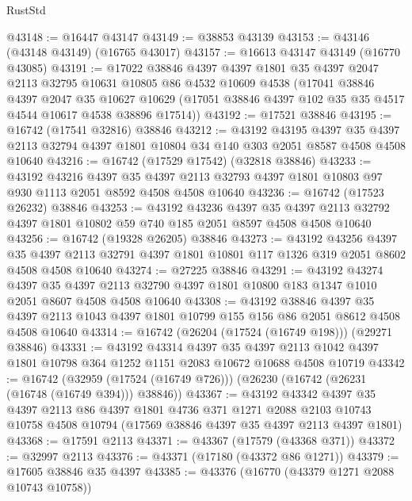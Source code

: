 \begin{lexlean}{RustStd}
\begin{coremodule}
@43148 := @16447 @43147
@43149 := @38853 @43139
@43153 := @43146 (@43148 @43149) (@16765 @43017)
@43157 := @16613 @43147 @43149 (@16770 @43085)
@43191 := @17022
    @38846
    @4397
    @4397
    @1801
    @35
    @4397
    @2047
    @2113
    @32795
    @10631
    @10805
    @86
    @4532
    @10609
    @4538
    (@17041
      @38846
      @4397
      @2047
      @35
      @10627
      @10629
      (@17051 @38846 @4397 @102 @35 @35 @4517 @4544 @10617 @4538 @38896 @17514))
@43192 := @17521 @38846
@43195 := @16742 (@17541 @32816) @38846
@43212 := @43192
    @43195
    @4397
    @35
    @4397
    @2113
    @32794
    @4397
    @1801
    @10804
    @34
    @140
    @303
    @2051
    @8587
    @4508
    @4508
    @10640
@43216 := @16742 (@17529 @17542) (@32818 @38846)
@43233 := @43192
    @43216
    @4397
    @35
    @4397
    @2113
    @32793
    @4397
    @1801
    @10803
    @97
    @930
    @1113
    @2051
    @8592
    @4508
    @4508
    @10640
@43236 := @16742 (@17523 @26232) @38846
@43253 := @43192
    @43236
    @4397
    @35
    @4397
    @2113
    @32792
    @4397
    @1801
    @10802
    @59
    @740
    @185
    @2051
    @8597
    @4508
    @4508
    @10640
@43256 := @16742 (@19328 @26205) @38846
@43273 := @43192
    @43256
    @4397
    @35
    @4397
    @2113
    @32791
    @4397
    @1801
    @10801
    @117
    @1326
    @319
    @2051
    @8602
    @4508
    @4508
    @10640
@43274 := @27225 @38846
@43291 := @43192
    @43274
    @4397
    @35
    @4397
    @2113
    @32790
    @4397
    @1801
    @10800
    @183
    @1347
    @1010
    @2051
    @8607
    @4508
    @4508
    @10640
@43308 := @43192
    @38846
    @4397
    @35
    @4397
    @2113
    @1043
    @4397
    @1801
    @10799
    @155
    @156
    @86
    @2051
    @8612
    @4508
    @4508
    @10640
@43314 := @16742 (@26204 (@17524 (@16749 @198))) (@29271 @38846)
@43331 := @43192
    @43314
    @4397
    @35
    @4397
    @2113
    @1042
    @4397
    @1801
    @10798
    @364
    @1252
    @1151
    @2083
    @10672
    @10688
    @4508
    @10719
@43342 := @16742
    (@32959 (@17524 (@16749 @726)))
    (@26230 (@16742 (@26231 (@16748 (@16749 @394))) @38846))
@43367 := @43192
    @43342
    @4397
    @35
    @4397
    @2113
    @86
    @4397
    @1801
    @4736
    @371
    @1271
    @2088
    @2103
    @10743
    @10758
    @4508
    @10794
    (@17569 @38846 @4397 @35 @4397 @2113 @4397 @1801)
@43368 := @17591 @2113
@43371 := @43367 (@17579 (@43368 @371))
@43372 := @32997 @2113
@43376 := @43371 (@17180 (@43372 @86 @1271))
@43379 := @17605 @38846 @35 @4397
@43385 := @43376 (@16770 (@43379 @1271 @2088 @10743 @10758))

\end{coremodule}
\end{lexlean}
